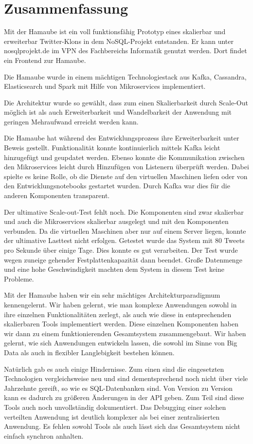 \chapter{Zusammenfassung}
Mit der Hamaube ist ein voll funktionsfähig Prototyp eines skalierbar
und erweiterbar Twitter-Klons in dem NoSQL-Projekt entstanden. Er kann
unter nosqlprojekt.de im VPN des Fachbereichs Informatik genutzt
werden. Dort findet ein Frontend zur Hamaube.

Die Hamaube wurde in einem mächtigen Technologiestack aus Kafka,
Cassandra, Elasticsearch und Spark mit Hilfe von Mikroservices
implementiert.

Die Architektur wurde so gewählt, dass zum einen Skalierbarkeit durch
Scale-Out möglich ist als auch Erweiterbarkeit und Wandelbarkeit der
Anwendung mit geringen Mehraufwand erreicht werden kann.

Die Hamaube hat während des Entwicklungsprozess ihre Erweiterbarkeit
unter Beweis gestellt. Funktionalität konnte kontinuierlich mittels
Kafka leicht hinzugefügt und geupdatet werden. Ebenso konnte die
Kommunikation zwischen den Mikroservices leicht durch Hinzufügen von
Listenern überprüft werden. Dabei spielte es keine Rolle, ob die
Dienste auf den virtuellen Maschinen liefen oder von den
Entwicklungsnotebooks gestartet wurden. Durch Kafka war dies für die
anderen Komponenten transparent.

Der ultimative Scale-out-Test fehlt noch. Die Komponenten sind zwar
skalierbar und auch die Mikroservices skalierbar ausgelegt und mit den
Komponenten verbunden. Da die virtuellen Maschinen aber nur auf einem
Server liegen, konnte der ultimative Lasttest nicht erfolgen. Getestet
wurde das System mit 80 Tweets pro Sekunde über einige Tage. Dies
konnte es gut verarbeiten. Der Test wurde wegen zuneige gehender
Festplattenkapazität dann beendet. Große Datenmenge und eine hohe
Geschwindigkeit machten dem System in diesem Test keine Probleme.

Mit der Hamaube haben wir ein sehr mächtiges Architekturparadigmum
kennengelernt. Wir haben gelernt, wie man komplexe Anwendungen sowohl
in ihre einzelnen Funktionalitäten zerlegt, als auch wie diese in
entsprechenden skalierbaren Tools implementiert werden. Diese einzelnen
Komponenten haben wir dann zu einem funktionierenden Gesamtsystem
zusammengebaut. Wir haben gelernt, wie sich Anwendungen entwickeln
lassen, die sowohl im Sinne von Big Data als auch in flexibler
Langlebigkeit bestehen können.

Natürlich gab es auch einige Hindernisse. Zum einen sind die
eingesetzten Technologien vergleichsweise neu und sind dementsprechend
noch nicht über viele Jahrzehnte gereift, so wie es SQL-Datenbanken
sind. Von Version zu Version kann es dadurch zu größeren Änderungen in
der API geben. Zum Teil sind diese Tools auch noch unvollständig
dokumentiert. Das Debugging einer solchen verteilten Anwendung ist 
deutlich komplexer als bei einer zentralisierten Anwendung. Es fehlen
sowohl Tools als auch lässt sich das Gesamtsystem nicht einfach
synchron anhalten.

